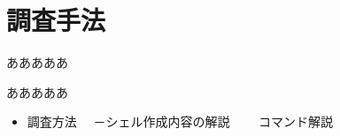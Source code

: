 \newpage
\section{調査手法}
あああああ

あああああ

\begin{itemize}
\item 調査方法
　－シェル作成内容の解説
　　コマンド解説
\end{itemize}